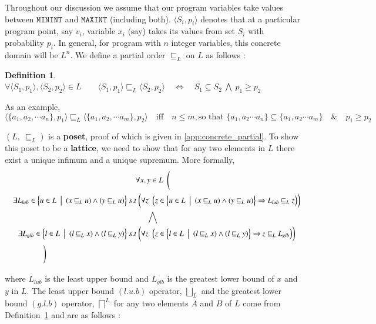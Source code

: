\documentclass[final,3p, review, times]{Elsevier/elsarticle}
\newtheorem{definition}{Definition}[section]
\begin{document}
Throughout our discussion we assume that our program variables take values between $\mathbf{\mathtt{MININT}}$ and $\mathbf{\mathtt{MAXINT}}$ (including both). $\langle S_i,p_i\rangle$ denotes that at a particular program point, say $v_i$, variable $x_i$ (say) takes its values from set $S_i$ with probability $p_i$. In general, for program with $n$ integer variables, this concrete domain will be $L^n$. We define a partial order $\sqsubseteq_L$ on $L$ as follows :
\begin{definition}\label{concrete_order}
$\forall \langle S_1,p_1\rangle, \langle S_2,p_2\rangle\in L\qquad\langle S_1,p_1\rangle\sqsubseteq_L \langle S_2,p_2\rangle\quad\iff \quad S_1\subseteq S_2\ \bigwedge\ p_1\geq p_2$
\end{definition}
As an example,
\[ \langle\{a_1, a_2,\cdots a_n\},p_1\rangle\sqsubseteq_L\langle\{a_1, a_2,\cdots a_m\},p_2\rangle\quad\text{iff}\quad n\leq m, \text{so that\ }\{a_1,a_2\cdots a_n\}\subseteq\{a_1,a_2\cdots a_m\}\quad\&\quad p_1\geq p_2 \]

$(L,\ \sqsubseteq_L)$ is a \textbf{poset}, proof of which is given in \ref{app:concrete_partial}. To show this poset to be a \textbf{lattice}, we need to show that for any two elements in $L$ there exist a unique infimum and a unique supremum. More formally,
\begin{multline*}
  \forall x,y\in L\ \ \Bigg( \\
  \quad\exists L_{lub}\in\Big\{u\in L\ \ \big|\ \ (x\sqsubseteq_L u)\land(y\sqsubseteq_L u)\Big\}\ s.t\ \bigg(\forall z\ \ \Big(z\in\Big\{u\in L\ \ \big|\ \ (x\sqsubseteq_L u)\land(y\sqsubseteq_L u)\Big\} \Rightarrow L_{lub}\sqsubseteq_L z\Big)\bigg) \\
  \hfill\bigwedge\hfill \\
  \quad\exists L_{glb}\in\Big\{l\in L\ \ \big|\ \ (l\sqsubseteq_L x)\land(l\sqsubseteq_L y)\Big\}\ s.t\ \bigg(\forall z\ \ \Big(z\in\Big\{l\in L\ \ \big|\ \ (l\sqsubseteq_L x)\land(l\sqsubseteq_L y)\Big\} \Rightarrow z\sqsubseteq_L L_{glb}\Big)\bigg) \\
  \quad\qquad\qquad\Bigg)\hfill
\end{multline*}

where $L_{lub}$ is the least upper bound and $L_{glb}$ is the greatest lower bound of $x$ and $y$ in $L$. The least upper bound $(l.u.b)$ operator, $\displaystyle\bigsqcup_L$ and the greatest lower bound $(g.l.b)$ operator, $\displaystyle\bigsqcap^L$ for any two elements $A$ and $B$ of $L$ come from Definition~\ref{concrete_order} and are as follows :
\end{document}
